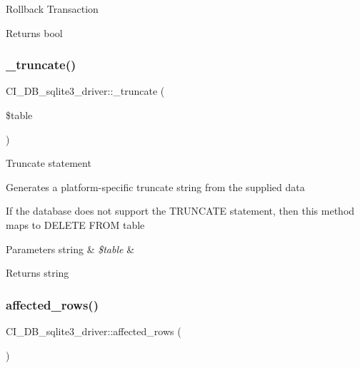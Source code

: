Rollback Transaction

\begin{DoxyReturn}{Returns}
bool 
\end{DoxyReturn}
\mbox{\label{class_c_i___d_b__sqlite3__driver_a5990cfd28a8c3500de04529363a99455}} 
\subsubsection{\texorpdfstring{\+\_\+truncate()}{\_truncate()}}
{\footnotesize\ttfamily C\+I\+\_\+\+D\+B\+\_\+sqlite3\+\_\+driver\+::\+\_\+truncate (\begin{DoxyParamCaption}\item[{}]{\$table }\end{DoxyParamCaption})\hspace{0.3cm}{\ttfamily [protected]}}

Truncate statement

Generates a platform-\/specific truncate string from the supplied data

If the database does not support the T\+R\+U\+N\+C\+A\+TE statement, then this method maps to \textquotesingle{}D\+E\+L\+E\+TE F\+R\+OM table\textquotesingle{}


\begin{DoxyParams}[1]{Parameters}
string & {\em \$table} & \\
\hline
\end{DoxyParams}
\begin{DoxyReturn}{Returns}
string 
\end{DoxyReturn}
\mbox{\label{class_c_i___d_b__sqlite3__driver_a779ce0845aaaa2e1cf53f0834359fcd3}} 
\subsubsection{\texorpdfstring{affected\+\_\+rows()}{affected\_rows()}}
{\footnotesize\ttfamily C\+I\+\_\+\+D\+B\+\_\+sqlite3\+\_\+driver\+::affected\+\_\+rows (\begin{DoxyParamCaption}{ }\end{DoxyParamCaption})}

